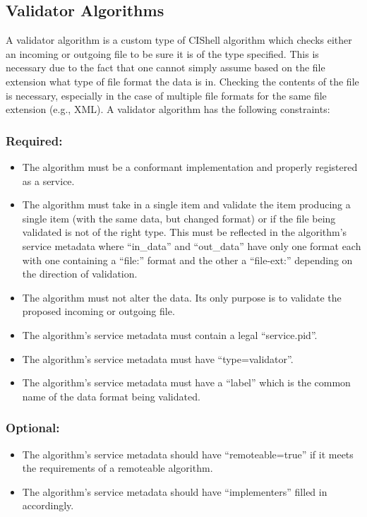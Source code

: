 \subsection{Validator Algorithms}

A validator algorithm is a custom type of CIShell algorithm which checks either
an incoming or outgoing file to be sure it is of the type specified. This is
necessary due to the fact that one cannot simply assume based on the file
extension what type of file format the data is in. Checking the contents of the
file is necessary, especially in the case of multiple file formats for the same
file extension (e.g., XML). A validator algorithm has the following constraints:

\subsubsection*{Required:}
\begin{itemize}
  \item The algorithm must be a conformant 
  implementation and properly registered as a service.
  \item The algorithm must take in a single  item and validate the
  item producing a single  item (with the same data, but changed
  format) or  if the file being validated is not of the right
  type. This must be reflected in the algorithm's service metadata where
  ``in\_data'' and ``out\_data'' have only one format each with one containing
  a ``file:'' format and the other a ``file-ext:'' depending on the direction
  of validation.
  \item The algorithm must not alter the data. Its only purpose is to validate
  the proposed incoming or outgoing file.
  \item The algorithm's service metadata must contain a legal ``service.pid''.
  \item The algorithm's service metadata must have ``type=validator''.
  \item The algorithm's service metadata must have a ``label'' which is the
  common name of the data format being validated.
\end{itemize}

\subsubsection*{Optional:}
\begin{itemize}
  \item The algorithm's service metadata should have ``remoteable=true'' if it
  meets the requirements of a remoteable algorithm.
  \item The algorithm's service metadata should have ``implementers'' filled
  in accordingly.
\end{itemize}
